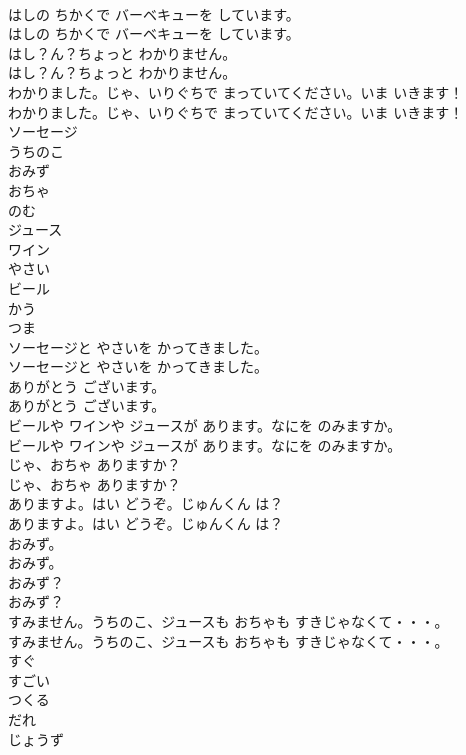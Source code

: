 \documentclass[8pt]{extreport}
\begin{document}
\begin{CJK}{UTF8}{min}
\\	はしの ちかくで バーベキューを しています。	
\\	はしの ちかくで バーベキューを しています。 
\\	はし？ん？ちょっと わかりません。	
\\	はし？ん？ちょっと わかりません。 
\\	わかりました。じゃ、いりぐちで まっていてください。いま いきます！	
\\	わかりました。じゃ、いりぐちで まっていてください。いま いきます！ 
\\	ソーセージ
\\	うちのこ
\\	おみず
\\	おちゃ
\\	のむ
\\	ジュース
\\	ワイン
\\	やさい
\\	ビール
\\	かう
\\	つま
\\	ソーセージと やさいを かってきました。	
\\	ソーセージと やさいを かってきました。 
\\	ありがとう ございます。	
\\	ありがとう ございます。 
\\	ビールや ワインや ジュースが あります。なにを のみますか。	
\\	ビールや ワインや ジュースが あります。なにを のみますか。 
\\	じゃ、おちゃ ありますか？	
\\	じゃ、おちゃ ありますか？ 
\\	ありますよ。はい どうぞ。じゅんくん は？	
\\	ありますよ。はい どうぞ。じゅんくん は？ 
\\	おみず。	
\\	おみず。 
\\	おみず？	
\\	おみず？ 
\\	すみません。うちのこ、ジュースも おちゃも すきじゃなくて・・・。	
\\	すみません。うちのこ、ジュースも おちゃも すきじゃなくて・・・。 
\\	すぐ
\\	すごい
\\	つくる
\\	だれ
\\	じょうず

\end{CJK}
\end{document}
